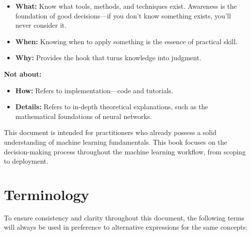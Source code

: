 \documentclass[12pt,openany]{book}
\begin{document}
\begin{itemize}
    \item \textcolor{green!50!black}{\textbf{What:}} Know what tools, methods, and techniques exist. Awareness is the foundation of good decisions—if you don’t know something exists, you’ll never consider it.
    \item \textcolor{green!50!black}{\textbf{When:}} Knowing when to apply something is the essence of practical skill.
    \item \textcolor{green!50!black}{\textbf{Why:}} Provides the hook that turns knowledge into judgment.
\end{itemize}

\vspace{1em}
\textbf{Not about:}

\begin{itemize}
    \item \textcolor{red!70!black}{\textbf{How:}} Refers to implementation—code and tutorials.
    \item \textcolor{red!70!black}{\textbf{Details:}} Refers to in-depth theoretical explanations, such as the mathematical foundations of neural networks.
\end{itemize}


This document is intended for practitioners who already possess a 
solid understanding of machine learning fundamentals. This book focuses on the decision-making process throughout the machine learning workflow, from scoping to deployment.



\section{Terminology}

To ensure consistency and clarity throughout this document, the following terms will always be used in preference to alternative expressions for the same concepts:
\end{document}
